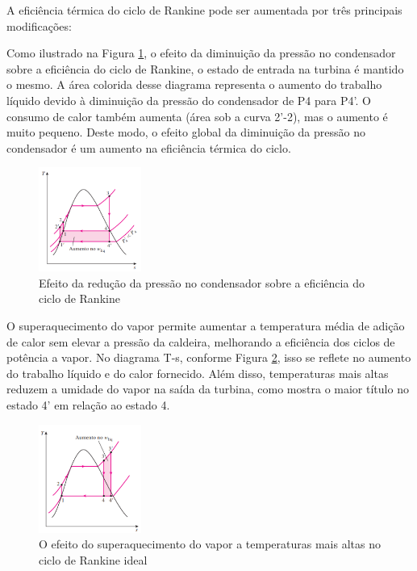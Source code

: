 \documentclass[
	article,			%
	11pt,				%
	oneside,			%
	a4paper,			%
	english,			%
	brazil,				%
	sumario=tradicional
	]{abntex2}
\begin{document}
A eficiência térmica do ciclo de Rankine pode ser aumentada por três principais modificações:


Como ilustrado na Figura \ref{fig:reducao-pressao}, o efeito da diminuição da pressão no condensador sobre a eficiência do ciclo de Rankine, o estado de entrada na turbina é mantido o mesmo. A área colorida desse diagrama representa o aumento do trabalho líquido devido à diminuição da pressão do condensador de P4 para P4'. O consumo de calor também aumenta (área sob a curva 2'-2), mas o aumento é muito pequeno. Deste modo, o efeito global da diminuição da pressão no condensador é um aumento na eficiência térmica do ciclo.

\begin{figure}[h]
	\centering
	\includegraphics[width=0.3\textwidth]{./images/reducao-pressao.png}
	\caption{Efeito da redução da pressão no condensador sobre a eficiência do ciclo de Rankine}
	\label{fig:reducao-pressao}
\end{figure}


O superaquecimento do vapor permite aumentar a temperatura média de adição de calor sem elevar a pressão da caldeira, melhorando a eficiência dos ciclos de potência a vapor. No diagrama T-s, conforme Figura \ref{fig:superaqueci}, isso se reflete no aumento do trabalho líquido e do calor fornecido. Além disso, temperaturas mais altas reduzem a umidade do vapor na saída da turbina, como mostra o maior título no estado 4' em relação ao estado 4.

\begin{figure}[h]
	\centering
	\includegraphics[width=0.3\textwidth]{./images/superaqueci.png}
	\caption{O efeito do superaquecimento do vapor a temperaturas mais altas no ciclo de Rankine ideal}
	\label{fig:superaqueci}
\end{figure}
\end{document}
